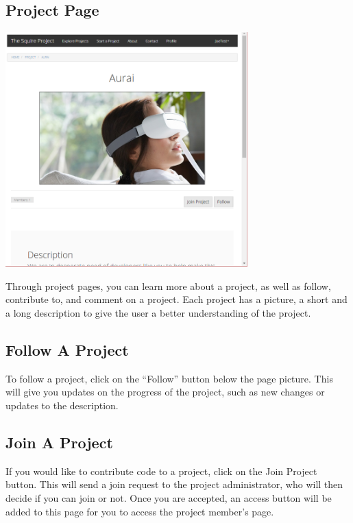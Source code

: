 \documentclass[11pt]{report}
\begin{document}
\subsection{Project Page}
	\begin{center}
           \includegraphics[width=0.7\textwidth]{userguide/projectpage_top}
    \end{center}
    Through project pages, you can learn more about a project, as well as follow, contribute to, and comment on a project. Each project has a picture, a short and a long description to give the user a better understanding of the project.

\subsection{Follow A Project}
    To follow a project, click on the  “Follow” button below the page picture. This will give you updates on the progress of the project, such as new changes or updates to the description. 

\subsection{Join A Project}
    If you would like to contribute code to a project, click on the Join Project button. This will send a join request to the project administrator, who will then decide if you can join or not. Once you are accepted, an access button will be added to this page for you to access the project member's page.
\end{document}
